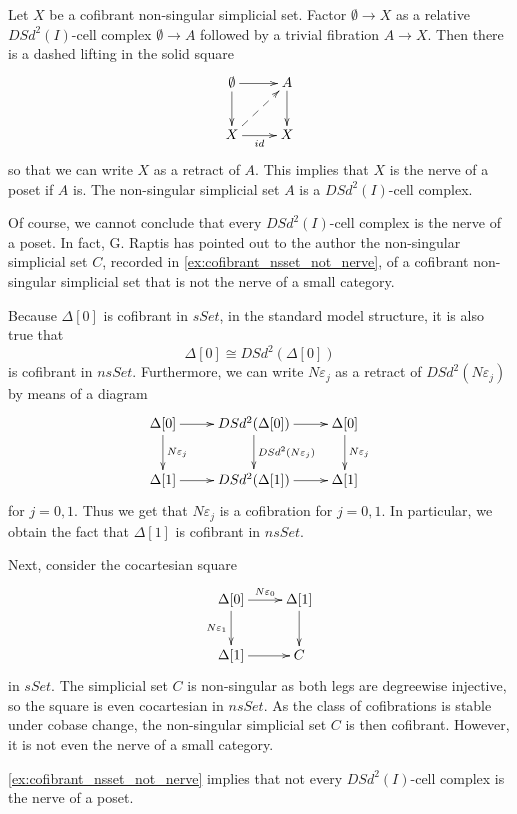 Let $X$ be a cofibrant non-singular simplicial set. Factor $\emptyset \to X$ as a relative $DSd^2(I)$-cell complex $\emptyset \to A$ followed by a trivial fibration $A\to X$. Then there is a dashed lifting in the solid square
\begin{displaymath}
\xymatrix{
\emptyset \ar[d] \ar[r] & A \ar[d] \\
X \ar[r]_{id} \ar@{-->}[ur] & X
}
\end{displaymath}
so that we can write $X$ as a retract of $A$. This implies that $X$ is the nerve of a poset if $A$ is. The non-singular simplicial set $A$ is a $DSd^2(I)$-cell complex.

Of course, we cannot conclude that every $DSd^2(I)$-cell complex is the nerve of a poset. In fact, G. Raptis has pointed out to the author the non-singular simplicial set $C$, recorded in \cref{ex:cofibrant_nsset_not_nerve}, of a cofibrant non-singular simplicial set that is not the nerve of a small category.
\begin{example}\label{ex:cofibrant_nsset_not_nerve}
Because $\Delta [0]$ is cofibrant in $sSet$, in the standard model structure, it is also true that
\[\Delta [0]\cong DSd^2(\Delta [0])\]
is cofibrant in $nsSet$. Furthermore, we can write $N\varepsilon _j$ as a retract of $DSd^2(N\varepsilon _j)$ by means of a diagram
\begin{displaymath}
\xymatrix{
\Delta [0] \ar[d]^{N\varepsilon _j} \ar[r] & DSd^2(\Delta [0]) \ar[d]^{DSd^2(N\varepsilon _j)} \ar[r] & \Delta [0] \ar[d]^{N\varepsilon _j} \\
\Delta [1] \ar[r] & DSd^2(\Delta [1]) \ar[r] & \Delta [1]
}
\end{displaymath}
for $j=0,1$. Thus we get that $N\varepsilon _j$ is a cofibration for $j=0,1$. In particular, we obtain the fact that $\Delta [1]$ is cofibrant in $nsSet$.

Next, consider the cocartesian square
\begin{displaymath}
\xymatrix{
\Delta [0] \ar[d]_{N\varepsilon _1} \ar[r]^{N\varepsilon _0} & \Delta [1] \ar[d] \\
\Delta [1] \ar[r] & C
}
\end{displaymath}
in $sSet$. The simplicial set $C$ is non-singular as both legs are degreewise injective, so the square is even cocartesian in $nsSet$. As the class of cofibrations is stable under cobase change, the non-singular simplicial set $C$ is then cofibrant. However, it is not even the nerve of a small category.
\end{example}
\noindent \cref{ex:cofibrant_nsset_not_nerve} implies that not every $DSd^2(I)$-cell complex is the nerve of a poset.

